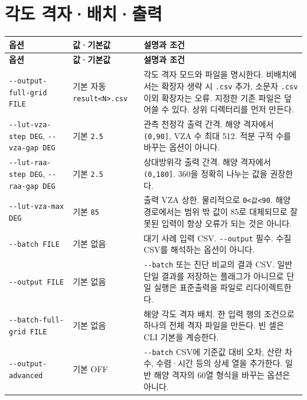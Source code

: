 \section{각도 격자·배치·출력}
\label{sec:auto:03_options:7}

{\TableFont
\begin{longtable}{@{}>{\raggedright\arraybackslash}p{}>{\raggedright\arraybackslash}p{}>{\raggedright\arraybackslash}p{}@{}}
\toprule
\textbf{옵션} & \textbf{값·기본값} & \textbf{설명과 조건} \\
\midrule
\endfirsthead
\toprule
\textbf{옵션} & \textbf{값·기본값} & \textbf{설명과 조건} \\
\midrule
\endhead
\bottomrule
\endfoot
\texttt{-\allowbreak{}-\allowbreak{}output-\allowbreak{}full-\allowbreak{}grid FILE} & 기본 자동 \texttt{result<N>.\allowbreak{}csv} & 각도 격자 모드와 파일을 명시한다. 비배치에서는 확장자 생략 시 \texttt{.\allowbreak{}csv} 추가, 소문자 \texttt{.\allowbreak{}csv} 이외 확장자는 오류. 지정한 기존 파일은 덮어쓸 수 있다. 상위 디렉터리를 먼저 만든다. \\
\texttt{-\allowbreak{}-\allowbreak{}lut-\allowbreak{}vza-\allowbreak{}step DEG}, \texttt{-\allowbreak{}-\allowbreak{}vza-\allowbreak{}gap DEG} & 기본 \texttt{2.\allowbreak{}5\textdegree{}} & 관측 천정각 출력 간격. 해양 격자에서 \texttt{(0,\allowbreak{}90]}, VZA 수 최대 512. 적분 구적 수를 바꾸는 옵션이 아니다. \\
\texttt{-\allowbreak{}-\allowbreak{}lut-\allowbreak{}raa-\allowbreak{}step DEG}, \texttt{-\allowbreak{}-\allowbreak{}raa-\allowbreak{}gap DEG} & 기본 \texttt{2.\allowbreak{}5\textdegree{}} & 상대방위각 출력 간격. 해양 격자에서 \texttt{(0,\allowbreak{}180]}. 360을 정확히 나누는 값을 권장한다. \\
\texttt{-\allowbreak{}-\allowbreak{}lut-\allowbreak{}vza-\allowbreak{}max DEG} & 기본 \texttt{85\textdegree{}} & 출력 VZA 상한. 물리적으로 \texttt{0<값<90}. 해양 경로에서는 범위 밖 값이 85로 대체되므로 잘못된 입력이 항상 오류가 되는 것은 아니다. \\
\texttt{-\allowbreak{}-\allowbreak{}batch FILE} & 기본 없음 & 대기 사례 입력 CSV. \texttt{-\allowbreak{}-\allowbreak{}output} 필수. 수질 CSV를 해석하는 옵션이 아니다. \\
\texttt{-\allowbreak{}-\allowbreak{}output FILE} & 기본 없음 & \texttt{-\allowbreak{}-\allowbreak{}batch} 또는 진단 비교의 결과 CSV. 일반 단일 결과를 저장하는 플래그가 아니므로 단일 실행은 표준출력을 파일로 리다이렉트한다. \\
\texttt{-\allowbreak{}-\allowbreak{}batch-\allowbreak{}full-\allowbreak{}grid FILE} & 기본 없음 & 해양 각도 격자 배치. 한 입력 행의 조건으로 하나의 전체 격자 파일을 만든다. 빈 셀은 CLI 기본을 계승한다. \\
\texttt{-\allowbreak{}-\allowbreak{}output-\allowbreak{}advanced} & 기본 OFF & \texttt{-\allowbreak{}-\allowbreak{}batch} CSV에 기준값 대비 오차, 산란 차수, 수렴·시간 등의 상세 열을 추가한다. 일반 해양 격자의 60열 형식을 바꾸는 옵션은 아니다. \\
\end{longtable}
}

